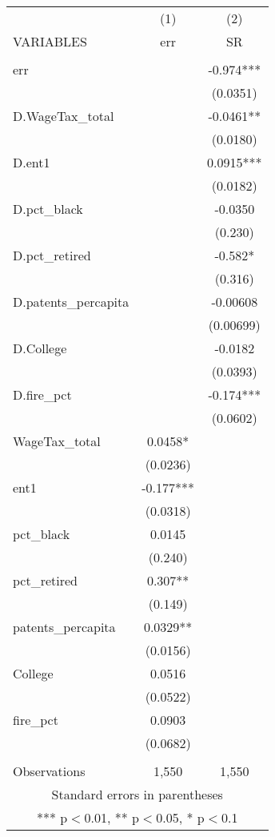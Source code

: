 \begin{tabular}{lcc} \hline
 & (1) & (2) \\
VARIABLES & err & SR \\ \hline
 &  &  \\
err &  & -0.974*** \\
 &  & (0.0351) \\
D.WageTax\_total &  & -0.0461** \\
 &  & (0.0180) \\
D.ent1 &  & 0.0915*** \\
 &  & (0.0182) \\
D.pct\_black &  & -0.0350 \\
 &  & (0.230) \\
D.pct\_retired &  & -0.582* \\
 &  & (0.316) \\
D.patents\_percapita &  & -0.00608 \\
 &  & (0.00699) \\
D.College &  & -0.0182 \\
 &  & (0.0393) \\
D.fire\_pct &  & -0.174*** \\
 &  & (0.0602) \\
WageTax\_total & 0.0458* &  \\
 & (0.0236) &  \\
ent1 & -0.177*** &  \\
 & (0.0318) &  \\
pct\_black & 0.0145 &  \\
 & (0.240) &  \\
pct\_retired & 0.307** &  \\
 & (0.149) &  \\
patents\_percapita & 0.0329** &  \\
 & (0.0156) &  \\
College & 0.0516 &  \\
 & (0.0522) &  \\
fire\_pct & 0.0903 &  \\
 & (0.0682) &  \\
 &  &  \\
 Observations & 1,550 & 1,550 \\ \hline
\multicolumn{3}{c}{ Standard errors in parentheses} \\
\multicolumn{3}{c}{ *** p$<$0.01, ** p$<$0.05, * p$<$0.1} \\
\end{tabular}
